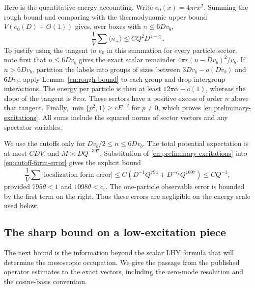 Here is the quantitative energy accounting.  Write
\(e_0(x)=4\pi rx^2\).  Summing the rough bound and comparing with the
thermodynamic upper bound
\(V(e_0(D)+O(1))\) gives, over boxes with \(n\le6Dv_b\),
\begin{equation}\label{en:preliminary-excitations}
 \frac1V\sum\langle n_+\rangle
           \le CQ^2D^{1-c_{\mathrm r}}.
\end{equation}
To justify using the tangent to \(e_0\) in this summation for every
particle sector, note first that \(n\le6Dv_b\) gives the exact scalar
remainder \(4\pi r(n-Dv_b)^2/v_b\).  If \(n>6Dv_b\), partition
the labels into groups of sizes between \(3Dv_b-o(Dv_b)\) and
\(6Dv_b\), apply Lemma~\ref{en:rough-bound} to each group and drop
intergroup interactions.  The energy per particle is then at least
\(12\pi\alpha-o(1)\), whereas the slope of the tangent is
\(8\pi\alpha\).  These sectors have a positive excess of order
\(n\) above that tangent.  Finally,
\(\min\{p^2,1\}\ge cE^{-2}\) for \(p\ne0\), which proves
\eqref{en:preliminary-excitations}.  All sums include the squared norms
of sector vectors and any spectator variables.

We use the cutoffs only for \(Dv_b/2\le n\le6Dv_b\).
The total potential expectation is at most \(CDV\), and
\(M\asymp DQ^{-397}\).  Substitution of
\eqref{en:preliminary-excitations} into
\eqref{en:cutoff-form-error} gives the explicit bound
\begin{equation}\label{en:localization-density-error}
 \frac1V\sum\left|\text{localization form error}\right|
 \le C\left(D^{-1}Q^{794}+D^{-c_{\mathrm r}}Q^{1097}\right)
 \le CQ^{-1},
\end{equation}
provided \(795\theta<1\) and \(1098\theta<c_{\mathrm r}\).
The one-particle observable error is bounded by the first term on the
right.  Thus these errors are negligible on the energy scale used below.



\subsection{The sharp bound on a low-excitation piece}

The next bound is the information beyond the scalar LHY formula that
will determine the mesoscopic occupation.  We give the passage from the
published operator estimates to the exact vectors, including the
zero-mode resolution and the cosine-basis convention.

